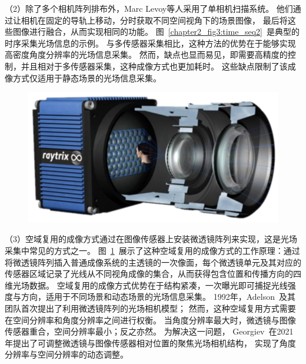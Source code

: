 （2）除了多个相机阵列排布外，Marc Levoy等人\cite{levoy2023light}采用了单相机扫描系统。
他们通过让相机在固定的导轨上移动，分时获取不同空间视角下的场景图像，
最后将这些图像进行融合，从而实现相同的功能。
图~\ref{chapter2_fig3:time_seq2}~是典型的时序采集光场信息的示例。
与多传感器采集相比，这种方法的优势在于能够实现高密度角度分辨率的光场信息采集。
然而，缺点也显而易见，即需要高精度的控制，并且相对于多传感器采集，这种成像方式也更加耗时。
这些缺点限制了该成像方式仅适用于静态场景的光场信息采集。\par
%
%
%
%
%
\begin{figure}[!ht]
	\centering
	\includegraphics[width=0.65\linewidth]{figures/chapter2/microlens_for_lf_imaging2.drawio}
	\label{chapter2_fig4:microlens_for_lf_imaging}
\end{figure}
（3）空域复用的成像方式通过在图像传感器上安装微透镜阵列来实现，这是光场采集中常见的方式之一。
图~\ref{chapter2_fig4:microlens_for_lf_imaging}~展示了这种空域复用的成像方式的工作原理：通过将微透镜阵列插入普通成像系统的主透镜的一次像面，每个微透镜单元及其对应的传感器区域记录了光线从不同视角成像的集合，从而获得包含位置和传播方向的四维光场数据。
空域复用的成像方式优势在于结构紧凑，一次曝光即可捕捉光线强度与方向，适用于不同场景和动态场景的光场信息采集。
1992年，Adelson~\cite{adelson1992single}及其团队首次提出了利用微透镜阵列的光场相机模型；
然而，这种空域复用方式需要在空间分辨率和角度分辨率之间进行权衡。
当角度分辨率最大时，微透镜与图像传感器重合，空间分辨率最小；反之亦然。
为解决这一问题，
Georgiev~\cite{georgiev2010focused}在2021年提出了可调整微透镜与图像传感器相对位置的聚焦光场相机结构，
实现了角度分辨率与空间分辨率的动态调整。
%
%
%




